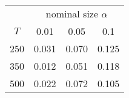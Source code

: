 % 
\begin{tabular}{cccc}
  \hline
  & \multicolumn{3}{c}{nominal size $\alpha$} \\
 $T$ & 0.01 & 0.05 & 0.1 \\
 \hline
250 & 0.031 & 0.070 & 0.125 \\ 
350 & 0.012 & 0.051 & 0.118 \\ 
500 & 0.022 & 0.072 & 0.105 \\ 
   \hline
\end{tabular}
